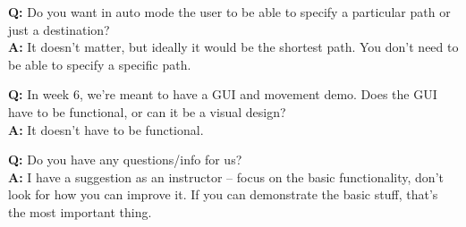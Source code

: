 \documentclass{article}
\newcounter{qcounter}
\begin{document}
\begin{list}{:~}{}
\item \textbf{Q:} Do you want in auto mode the user to be able to specify a particular path or just a destination?\\
\textbf{A:} It doesn’t matter, but ideally it would be the shortest path. You don’t need to be able to specify a specific path.\\
\item \textbf{Q:} In week 6, we’re meant to have a GUI and movement demo. Does the GUI have to be functional, or can it be a visual design?\\
\textbf{A:} It doesn’t have to be functional.\\
\item \textbf{Q:} Do you have any questions/info for us?\\
\textbf{A:} I have a suggestion as an instructor – focus on the basic functionality, don’t look for how you can improve it. If you can demonstrate the basic stuff, that’s the most important thing.\\
\end{list}
\end{document}
